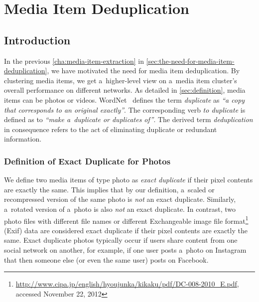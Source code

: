\chapter{Media Item Deduplication}
\label{sec:media-item-deduplication}

\ifpdf
    \graphicspath{{6_media_item_deduplication/figures/PNG/}{6_media_item_deduplication/figures/PDF/}{6_media_item_deduplication/figures/}}
\else
    \graphicspath{{6_media_item_deduplication/figures/EPS/}{6_media_item_deduplication/figures/}}
\fi

\section{Introduction}

In the previous \autoref{cha:media-item-extraction}
in \autoref{sec:the-need-for-media-item-deduplication},
we have motivated the need for media item deduplication.
By clustering media items, we get a~higher-level view on
a~media item cluster's overall performance on different networks.
As detailed in \autoref{sec:definition}, media items can be
photos or videos.
WordNet~\cite{fellbaum1998wordnet,miller1995wordnet} defines
the term \emph{duplicate} as
\textit{``a copy that corresponds to an original exactly''}.
The corresponding verb \emph{to duplicate} is defined as to
\textit{``make a~duplicate or duplicates of''}.
The derived term \emph{deduplication} in consequence refers to
the act of eliminating duplicate or redundant information.

\subsection{Definition of Exact Duplicate for Photos}

We define two media items of type photo as \emph{exact duplicate}
if their pixel contents are exactly the same.
This implies that by our definition, a~scaled or recompressed version
of the same photo is \emph{not} an exact duplicate. 
Similarly, a~rotated version of a~photo is also \emph{not}
an exact duplicate. 
In contrast, two photo files with different file names
or different Exchangeable image file
format\footnote{\url{http://www.cipa.jp/english/hyoujunka/kikaku/pdf/DC-008-2010_E.pdf},
accessed November 22, 2012}
(Exif) data are considered exact duplicate
if their pixel contents are exactly the same.
Exact duplicate photos typically occur if users share content 
from one social network on another, for example,
if one user posts a~photo on Instagram that then someone else
(or even the same user) posts on Facebook.

